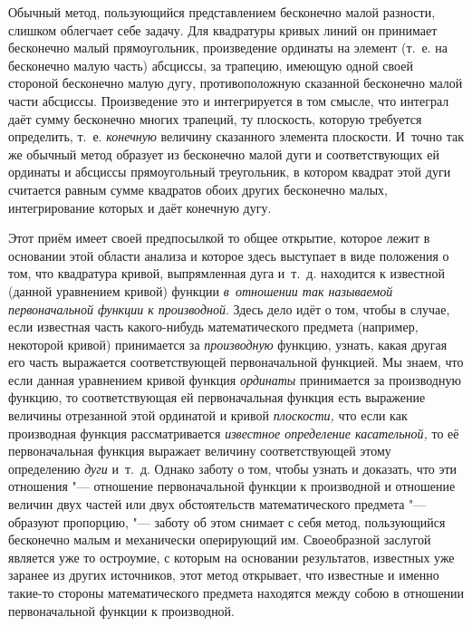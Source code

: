 Обычный метод, пользующийся представлением бесконечно малой разности, слишком
облегчает себе задачу. Для квадратуры кривых линий он принимает бесконечно
малый прямоугольник, произведение ординаты на элемент (т.~е. на бесконечно малую
часть) абсциссы, за трапецию, имеющую одной своей стороной бесконечно малую
дугу, противоположную сказанной бесконечно малой части абсциссы. Произведение
это и интегрируется в том смысле, что интеграл даёт сумму бесконечно многих
трапеций, ту плоскость, которую требуется определить, т.~е. {\em конечную}
величину сказанного элемента плоскости. И~точно так же обычный метод образует
из бесконечно малой дуги и соответствующих ей ординаты и абсциссы прямоугольный
треугольник, в котором квадрат этой дуги считается равным сумме квадратов обоих
других бесконечно малых, интегрирование которых и даёт конечную дугу.

Этот приём имеет своей предпосылкой то общее открытие, которое лежит в
основании этой области анализа и которое здесь выступает в виде положения о
том, что квадратура кривой, выпрямленная дуга и~т.~д. находится к известной
(данной уравнением кривой) функции {\em в~отношении так называемой
первоначальной функции к производной}. Здесь дело идёт о том, чтобы в случае,
если известная часть какого-нибудь математического предмета (например,
некоторой кривой) принимается за {\em производную} функцию, узнать, какая другая его
часть выражается соответствующей первоначальной функцией. Мы знаем, что если
данная уравнением кривой функция {\em ординаты} принимается за производную
функцию, то соответствующая ей первоначальная функция есть выражение величины
отрезанной этой ординатой и кривой {\em плоскости,} что если как производная
функция рассматривается {\em известное определение касательной,} то её
первоначальная функция выражает величину соответствующей этому определению
{\em дуги} и~т.~д. Однако заботу о том, чтобы узнать и доказать, что эти
отношения "--- отношение первоначальной функции к производной и отношение
величин двух частей или двух обстоятельств математического предмета "---
образуют пропорцию, "--- заботу об этом снимает с себя метод, пользующийся
бесконечно малым и механически оперирующий им. Своеобразной заслугой является
уже то остроумие, с которым на основании результатов, известных уже заранее из
других источников, этот метод открывает, что известные и именно такие-то
стороны математического предмета находятся между собою в отношении
первоначальной функции к производной.

